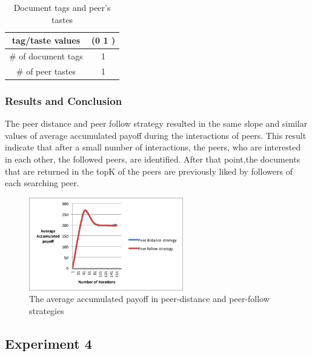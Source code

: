 \documentclass [12pt]{article} \usepackage{multicol}
\begin{document}
\begin{table}[h!]
\caption{Document tags and peer's tastes}

\begin{center}

\begin{tabular}{|c|c|}
\hline tag/taste values & (0 1 )\\
\hline \# of document tags   &  1\\ \hline 
\# of peer tastes  &  1 \\ \hline 
\end{tabular}

\end{center}
\label{default}
\end{table}





\subsubsection{Results and Conclusion}

The peer distance and peer follow strategy resulted in the same slope and similar values of 
average accumulated payoff during the interactions of peers. This result indicate that after a small number of
interactions, the peers, who are interested in each other, the followed peers, are identified. 
After that point,the documents that are returned in the topK of the peers are previously liked by followers of each searching peer. 


\begin{figure}[h!]
\begin{center}
\includegraphics[width=0.6\textwidth,center]{images/distance-follow}
\caption{The average accumulated payoff in peer-distance and peer-follow strategies}
\label{fig:images/EXP3-2}
\end{center}
\end{figure}


\subsection{Experiment 4}
\end{document}
